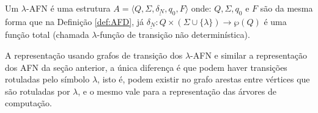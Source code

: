 \begin{definicao}\label{def:LAFN}
	Um $\lambda$-AFN é uma estrutura $A = \langle Q, \Sigma, \underline{\delta_N}, q_0, F\rangle$ onde: $Q, \Sigma, q_0$ e $F$ são da mesma forma que na Definição \ref{def:AFD}, já $\underline{\delta_N} : Q \times (\Sigma \cup \{\lambda\}) \rightarrow \wp(Q)$ é uma função total (chamada $\lambda$-função de transição não determinística).
\end{definicao}

A representação usando grafos de transição dos $\lambda$-AFN e similar a representação dos AFN da seção anterior, a única diferença é que podem haver transições rotuladas pelo símbolo $\lambda$, isto é, podem existir no grafo arestas entre vértices que são rotuladas por $\lambda$, e o mesmo vale para a representação das árvores de computação.